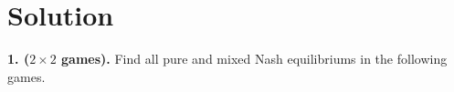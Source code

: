 \documentclass{article}
\begin{document}
\setlength{\parindent}{0pt}

\section*{Solution}

\textbf{1. (\(2\times 2\) games).}
Find all pure and mixed Nash equilibriums in the following games.


\vspace{1cm}

\vspace{1cm}

\vspace{1cm}

\vspace{1cm}

\vspace{1cm}

\end{document}
